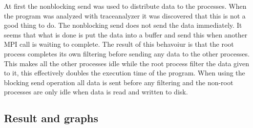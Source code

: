 \documentclass[a4paper,11pt]{article}
\begin{document}
At first the nonblocking send was used to distribute data to the processes.
When the program was analyzed with traceanalyzer it was discovered that this is not a good thing to do.
The nonblocking send does not send the data immediately.
It seems that what is done is put the data into a buffer and send this when another MPI call is waiting to complete.
The result of this behavoiur is that the root process completes its own filtering before sending any data to the other processes.
This makes all the other processes idle while the root process filter the data given to it, this effectively doubles the execution time of the program.
When using the blocking send operation all data is sent before any filtering and the non-root processes are only idle when data is read and written to disk.

\subsection{Result and graphs}

\clearpage
\end{document}

